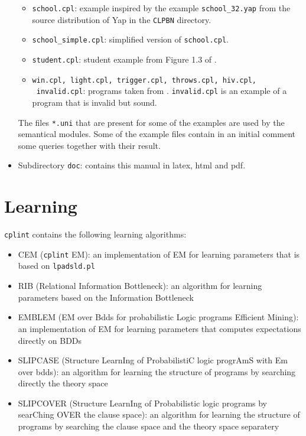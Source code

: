 \documentclass[a4paper,10pt]{article}
\begin{document}
\begin{itemize}
\begin{itemize}
\item \texttt{school.cpl}: example inspired by the example \verb|school_32.yap| from the 
source distribution of Yap in the \texttt{CLPBN} directory.
\item \verb|school_simple.cpl|: simplified version of \texttt{school.cpl}.
\item \verb|student.cpl|: student example from Figure 1.3 of \cite{GetFri01-BC}.
\item \texttt{win.cpl, light.cpl, trigger.cpl, throws.cpl, hiv.cpl,}\\ \texttt{ invalid.cpl}: programs taken from \cite{DBLP:journals/tplp/VennekensDB09}. \texttt{invalid.cpl} is an example of a  program that is invalid but sound.
\end{itemize}
The files \texttt{*.uni} that are present for some of the examples are used  by the semantical modules. Some of the example files contain in an initial comment some queries together with their result.
\item Subdirectory \texttt{doc}: contains this manual in latex, html and pdf.
\end{itemize}

\section{Learning}
\texttt{cplint} contains the following learning algorithms:
\begin{itemize}
\item CEM (\texttt{cplint} EM): an implementation of EM for learning parameters that is based on \texttt{lpadsld.pl} \cite{RigDiM11-ML-IJ}
\item RIB (Relational Information Bottleneck): an algorithm for learning parameters based on the Information Bottleneck \cite{RigDiM11-ML-IJ}
\item EMBLEM (EM over Bdds for probabilistic Logic programs Efficient Mining): an implementation of EM for learning parameters that computes expectations directly on BDDs \cite{BelRig11-IDA,BelRig11-CILC11-NC,BelRig11-TR}
\item SLIPCASE (Structure LearnIng of ProbabilistiC logic progrAmS with Em over bdds): an algorithm for learning the structure of programs by searching directly the theory space \cite{BelRig11-ILP11-IC}
\item SLIPCOVER (Structure LearnIng of Probabilistic logic programs by searChing OVER the clause space): an algorithm for learning the structure of programs by searching the clause space and the theory space separatery \cite{BelRig13-TPLP-IJ}
\end{itemize}
\end{document}
